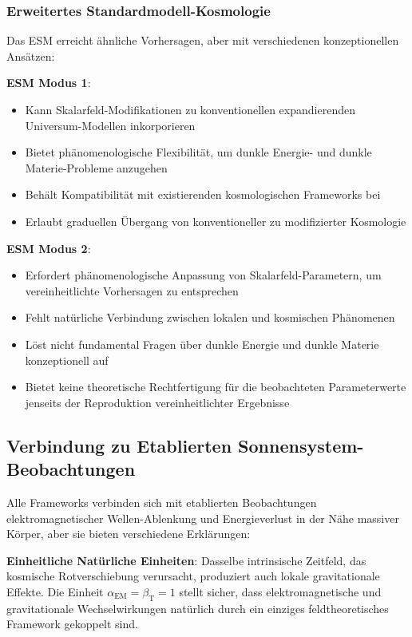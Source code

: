 \documentclass[12pt,a4paper]{article}
\newcommand{\alphaEM}{\alpha_{\text{EM}}}
\newcommand{\betaT}{\beta_{\text{T}}}
\begin{document}
	\subsubsection{Erweitertes Standardmodell-Kosmologie}
	\label{subsubsec:esm_cosmology}
	
	Das ESM erreicht ähnliche Vorhersagen, aber mit verschiedenen konzeptionellen Ansätzen:
	
	\textbf{ESM Modus 1}:
	\begin{itemize}
		\item Kann Skalarfeld-Modifikationen zu konventionellen expandierenden Universum-Modellen inkorporieren
		\item Bietet phänomenologische Flexibilität, um dunkle Energie- und dunkle Materie-Probleme anzugehen
		\item Behält Kompatibilität mit existierenden kosmologischen Frameworks bei
		\item Erlaubt graduellen Übergang von konventioneller zu modifizierter Kosmologie
	\end{itemize}
	
	\textbf{ESM Modus 2}:
	\begin{itemize}
		\item Erfordert phänomenologische Anpassung von Skalarfeld-Parametern, um vereinheitlichte Vorhersagen zu entsprechen
		\item Fehlt natürliche Verbindung zwischen lokalen und kosmischen Phänomenen
		\item Löst nicht fundamental Fragen über dunkle Energie und dunkle Materie konzeptionell auf
		\item Bietet keine theoretische Rechtfertigung für die beobachteten Parameterwerte jenseits der Reproduktion vereinheitlichter Ergebnisse
	\end{itemize}
	
	\subsection{Verbindung zu Etablierten Sonnensystem-Beobachtungen}
	\label{subsec:solar_system_observations}
	
	Alle Frameworks verbinden sich mit etablierten Beobachtungen elektromagnetischer Wellen-Ablenkung und Energieverlust in der Nähe massiver Körper, aber sie bieten verschiedene Erklärungen:
	
	\textbf{Einheitliche Natürliche Einheiten}: Dasselbe intrinsische Zeitfeld, das kosmische Rotverschiebung verursacht, produziert auch lokale gravitationale Effekte. Die Einheit $\alphaEM = \betaT = 1$ stellt sicher, dass elektromagnetische und gravitationale Wechselwirkungen natürlich durch ein einziges feldtheoretisches Framework gekoppelt sind.
	
\end{document}
